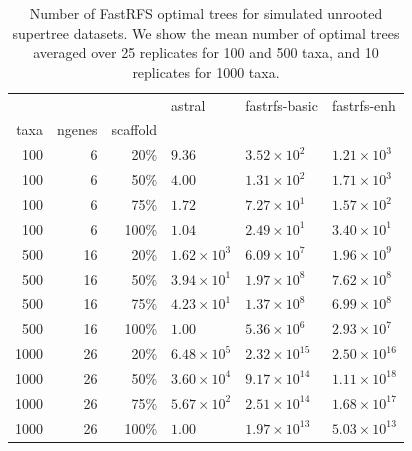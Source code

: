 \begin{table}[h]
\centering

\begin{tabular}{|rrr|lll|}
 
\hline
 & & & astral & fastrfs-basic & fastrfs-enh\\
taxa&ngenes&scaffold&&&\\


\hline 
\hline
100&6&20\%	&$9.36$	&$3.52\times 10^{2}$	&$1.21\times 10^{3}$\\
100&6&50\%	&$4.00$	&$1.31\times 10^{2}$	&$1.71\times 10^{3}$\\
100&6&75\%	&$1.72$	&$7.27\times 10^{1}$	&$1.57\times 10^{2}$\\
100&6&100\%	&$1.04$	&$2.49\times 10^{1}$	&$3.40\times 10^{1}$\\
\hline
500&16&20\%	&$1.62\times 10^{3}$	&$6.09\times 10^{7}$	&$1.96\times 10^{9}$\\
500&16&50\%	&$3.94\times 10^{1}$	&$1.97\times 10^{8}$	&$7.62\times 10^{8}$\\
500&16&75\%	&$4.23\times 10^{1}$	&$1.37\times 10^{8}$	&$6.99\times 10^{8}$\\
500&16&100\%	&$1.00$	&$5.36\times 10^{6}$	&$2.93\times 10^{7}$\\
\hline
1000&26&20\%	&$6.48\times 10^{5}$	&$2.32\times 10^{15}$	&$2.50\times 10^{16}$\\
1000&26&50\%	&$3.60\times 10^{4}$	&$9.17\times 10^{14}$	&$1.11\times 10^{18}$\\
1000&26&75\%	&$5.67\times 10^{2}$	&$2.51\times 10^{14}$	&$1.68\times 10^{17}$\\
1000&26&100\%	&$1.00$	&$1.97\times 10^{13}$	&$5.03\times 10^{13}$\\
\hline
\end{tabular}

\caption[Number of FastRFS optimal trees for simulated
  unrooted supertree datasets.]{Number of FastRFS optimal trees for simulated
  unrooted supertree datasets. We show the mean number
  of optimal trees averaged over 25 replicates for 100 and 500 taxa,
  and 10 replicates for 1000 taxa.} \label{tab:supertree_counts}
\end{table}

